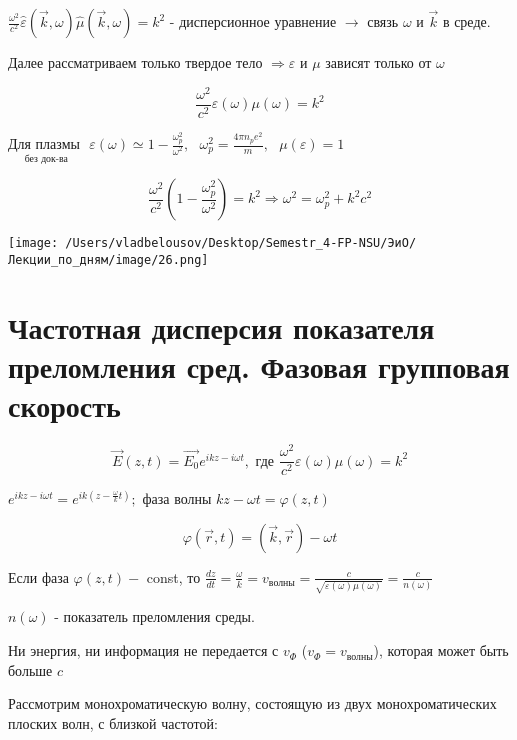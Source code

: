 \documentclass[12pt, a4paper]{report}
\begin{document}
\( \displaystyle \frac{\omega ^2 }{c ^2 }\hat{\varepsilon}  (\vec{k } , \omega )\hat{\mu} ( \vec{k } , \omega)= k ^2 \)    - дисперсионное уравнение \( \to       \)   связь \( \omega   \) и \( \vec{k }  \) в среде.

Далее рассматриваем только твердое тело \( \Rightarrow  \varepsilon  \) и \( \mu     \)  зависят только от \( \omega \) 

\[ \frac{\omega ^2 }{c ^2 } \varepsilon( \omega ) \mu ( \omega) = k ^2   \] 

\( \underset{\text{без док-ва} }{\text{Для плазмы } } \)  \( \displaystyle \varepsilon ( \omega ) \simeq 1- \frac{\omega _p ^2 }{\omega ^2 } , \text{ } \omega _ p ^2 = \frac{4 \pi n_p e ^2 }{m } , \text{ } \mu ( \varepsilon ) = 1    \) 

\[ \frac{\omega ^2 }{c ^2 } \left(  1 - \frac{\omega _p ^2}{\omega ^2 }  \right) =k ^2 \Rightarrow \omega ^2 = \omega_p ^2  + k ^2 c ^2   \] 

\begin{center}
    \texttt{[image: /Users/vladbelousov/Desktop/Semestr\_4-FP-NSU/ЭиО/Лекции\_по\_дням/image/26.png]}
\end{center}

\section{Частотная дисперсия показателя преломления сред. Фазовая групповая скорость}

\[ \vec{E } (z,t ) = \vec{E_0 }e^{ikz - i \omega t }  , \text{ где } \frac{\omega ^2 }{c ^2 }\varepsilon ( \omega )\mu( \omega ) =k ^2    \] 

\( e^{ikz - i \omega t }=e^{ik(z- \frac{\omega}{k } t  )} ;   \) фаза волны \( kz - \omega t = \varphi( z, t ) \) 

\[ \varphi ( \vec{r } , t ) = ( \vec{k }  , \vec{r }  ) - \omega t  \] 

Если фаза \(\displaystyle  \varphi( z , t ) -  \) const, то  \( \displaystyle \frac{dz}{dt } = \frac{\omega}{k } = v_{\text{волны} } = \frac{c}{\sqrt{\varepsilon (\omega ) \mu ( \omega)}} =\frac{c}{ n ( \omega)}   \)

\( n ( \omega ) \) - показатель преломления среды. 

Ни энергия, ни информация не передается с \( v_{\Phi  }  \) (\( v_{\Phi  }  =v_{\text{волны} } \)), которая может быть больше \( c \) 

Рассмотрим монохроматическую волну, состоящую из двух монохроматических плоских волн, с близкой частотой: 
\end{document}
